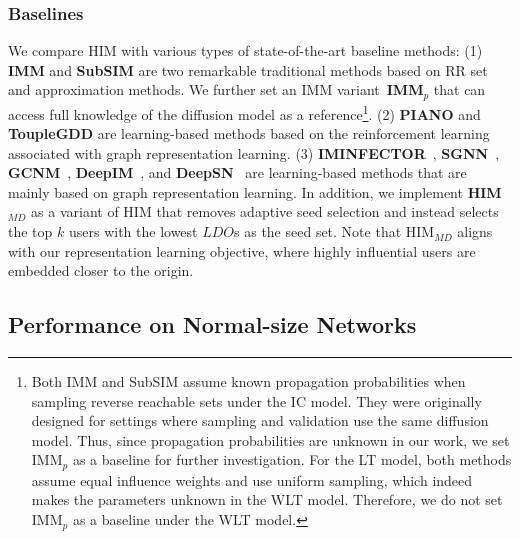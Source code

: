 \subsubsection{Baselines}
We compare HIM with various types of state-of-the-art baseline methods:
(1) \textbf{IMM} \cite{tang2015IMM}  
and \textbf{SubSIM} \cite{guo2020-RIS} are two remarkable traditional methods based on RR set and approximation methods.
We further set an IMM variant~\textbf{IMM$_{p}$} that can access full knowledge of the diffusion model as a reference\footnote{
Both IMM and SubSIM assume known propagation probabilities when sampling reverse reachable sets under the IC model. 
They were originally designed for settings where sampling and validation use the same diffusion model. 
Thus, since propagation probabilities are unknown in our work, we set IMM$_p$ as a baseline for further investigation.
For the LT model, both methods assume equal influence weights and use uniform sampling,
which indeed makes the parameters unknown in the WLT model. 
Therefore, we do not set IMM$_p$ as a baseline under the WLT model.
}.
(2) \textbf{PIANO} \cite{li2022piano} and \textbf{ToupleGDD} \cite{chen2023ToupleGDD} are learning-based methods based on the reinforcement learning associated with graph representation learning.
(3) \textbf{IMINFECTOR}~\cite{panagopoulos2020IMINFECTOR}, \textbf{SGNN}~\cite{kumar2022gnn}, \textbf{GCNM}~\cite{zhang2022GCNM}, \textbf{DeepIM}~\cite{ling2023icml},
and \textbf{DeepSN}~\cite{hevapathige2024_DeepSN} are learning-based methods that are mainly based on graph representation learning. 
In addition, we implement \textbf{HIM$_{MD}$} as a variant of HIM that removes adaptive seed selection and instead selects the top $k$ users with the lowest $LDO$s as the seed set.
Note that HIM$_{MD}$ aligns with our representation learning objective, where highly influential users are embedded closer to the origin.

\subsection{Performance on Normal-size Networks}
